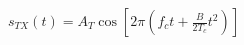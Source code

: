 \documentclass[preview, border=8pt, 12pt]{standalone}
\begin{document}
$\displaystyle 
s_{TX}(t) = A_T \cos\left[2\pi\left(f_c t + \frac{B}{2T_c} t^2\right)\right]
$
\end{document}
